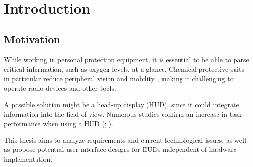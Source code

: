 \section{Introduction}

\subsection{Motivation}

While working in personal protection equipment, it is essential to be able to parse critical information, such as oxygen levels, at a glance. Chemical protective suits in particular reduce peripheral vision and mobility \parencite{murrayEffectsChemicalProtective2011}, making it challenging to operate radio devices and other tools.

A possible solution might be a head-up display (HUD), since it could integrate information into the field of view. Numerous studies confirm an increase in task performance when using a HUD (\cite{chauvinAugmentedRealityHUD2023}; \cite{kimInfluencesAugmentedReality2019}).

This thesis aims to analyze requirements and current technological issues, as well as propose potential user interface designs for HUDs independent of hardware implementation.